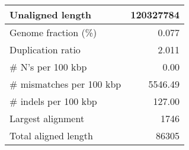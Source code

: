 \documentclass[12pt,a4paper]{article}
\begin{document}
\begin{table}[ht]
\begin{center}
\begin{tabular}{|l*{1}{|r}|}
Unaligned length & 120327784 \\ \hline
Genome fraction (\%) & 0.077 \\ \hline
Duplication ratio & 2.011 \\ \hline
\# N's per 100 kbp & 0.00 \\ \hline
\# mismatches per 100 kbp & 5546.49 \\ \hline
\# indels per 100 kbp & 127.00 \\ \hline
Largest alignment & 1746 \\ \hline
Total aligned length & 86305 \\ \hline
\end{tabular}
\end{center}
\end{table}
\end{document}
